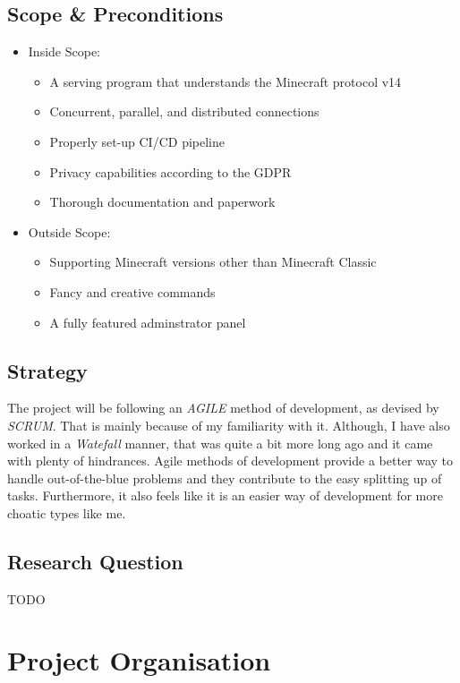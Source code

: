 \documentclass{article}
\begin{document}
    \newpage
    \subsection{Scope \& Preconditions}
    \begin{itemize}
        \item Inside Scope:
        \begin{itemize}
            \item A serving program that understands the Minecraft protocol v14
            \item Concurrent, parallel, and distributed connections
            \item Properly set-up CI/CD pipeline
            \item Privacy capabilities according to the GDPR
            \item Thorough documentation and paperwork
        \end{itemize}
        \item Outside Scope:
        \begin{itemize}
            \item Supporting Minecraft versions other than Minecraft Classic
            \item Fancy and creative commands
            \item A fully featured adminstrator panel
        \end{itemize}
    \end{itemize}

    \subsection{Strategy}
    The project will be following an \emph{AGILE} method of development, as devised by \emph{SCRUM}. That is mainly because of my familiarity with it. Although, I have also worked in a \emph{Watefall} manner, that was quite a bit more long ago and it came with plenty of hindrances. Agile methods of development provide a better way to handle out-of-the-blue problems and they contribute to the easy splitting up of tasks. Furthermore, it also feels like it is an easier way of development for more choatic types like me.

    \newpage
    \subsection{Research Question}
    TODO

\newpage
\section{Project Organisation}
\end{document}

